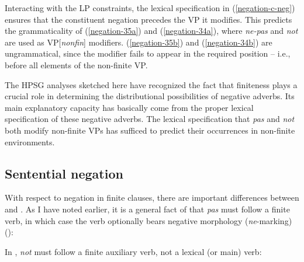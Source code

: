 \documentclass[output=paper
 	        ,biblatex
                ,babelshorthands
                ,newtxmath
                ,draftmode
                ,colorlinks, citecolor=brown
]{langscibook}
\begin{document}
\begin{exe}
\begin{xlist}
\begin{exe}
\begin{xlist}
\noindent
Interacting with the LP constraints, the lexical specification
in (\ref{negation-c-neg}) ensures that the constituent negation
precedes the VP it modifies. This predicts the
grammaticality of (\ref{negation-35a}) and (\ref{negation-34a}), where \textit{ne-pas} and \textit{not} are used as VP[\textit{nonfin}] modifiers.
(\ref{negation-35b}) and (\ref{negation-34b}) are ungrammatical, since
the modifier fails to appear in the required position -- i.e.,
before all elements of the non-finite VP.

The HPSG analyses sketched here have recognized
the fact that finiteness plays a crucial role in
determining the distributional possibilities of negative
adverbs. Its main explanatory capacity
has basically come from the proper lexical specification of these negative
adverbs. The lexical specification that \textit{pas} and
\textit{not} both modify non-finite VPs has sufficed to predict their
occurrences in non-finite environments.



\subsection{Sentential negation}
\label{sec-sentential-negation}\label{negation:sec-sentential-negation}

With respect to negation in finite clauses, there are important differences between  and .
As I have noted earlier, it is a general fact of  that \textit{pas} must follow a finite verb, in which case the verb optionally bears negative morphology (\textit{ne}-marking) (\citealp[]{KS:02}):

\eal
{}
\zl
\noindent
In , \textit{not} must follow a finite
auxiliary verb, not a lexical (or main) verb:

\eal
{}
\zl


\end{xlist}
\end{exe}
\end{xlist}
\end{exe}
\end{document}
